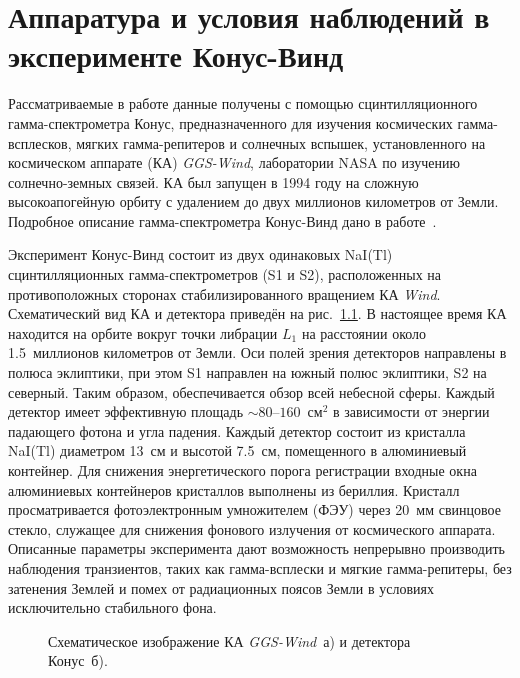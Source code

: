 \chapter{Аппаратура и условия наблюдений в эксперименте Конус-Винд} \label{KW_description}

Рассматриваемые в работе данные получены с помощью сцинтилляционного гамма-спектрометра 
Конус, предназначенного для изучения космических гамма-всплесков, мягких гамма-репитеров и солнечных вспышек,
установленного на космическом аппарате (КА) \textit{GGS-Wind}, лаборатории NASA по изучению 
солнечно-земных связей. КА был запущен в 1994 году на сложную высокоапогейную орбиту 
с удалением до двух миллионов километров от Земли. Подробное описание гамма-спектрометра 
Конус-Винд дано в работе~\citep{Aptekar_1995SSR}.

Эксперимент Конус-Винд состоит из двух одинаковых NaI(Tl) сцинтилляционных 
гамма-спектрометров (S1 и S2), расположенных на противоположных сторонах 
стабилизированного вращением КА \textit{Wind}. 
Схематический вид КА и детектора приведён на рис.~\ref{img:KW_main_view}.
В настоящее время КА находится на орбите вокруг точки либрации $L_1$ 
на расстоянии около 1.5~миллионов километров от Земли. Оси полей зрения детекторов 
направлены в полюса эклиптики, при этом S1 направлен на южный полюс эклиптики, 
S2 на северный. Таким образом, обеспечивается обзор всей небесной сферы. 
Каждый детектор имеет эффективную площадь $\sim 80\textrm{--}160$~см$^2$ в 
зависимости от энергии падающего фотона и угла падения. Каждый детектор состоит 
из кристалла NaI(Tl) диаметром 13~см и высотой 7.5~см, помещенного в алюминиевый 
контейнер. Для снижения энергетического порога регистрации входные окна алюминиевых 
контейнеров кристаллов выполнены из бериллия. Кристалл просматривается фотоэлектронным 
умножителем (ФЭУ) через 20~мм свинцовое стекло, служащее для снижения фонового 
излучения от космического аппарата. Описанные параметры эксперимента дают 
возможность непрерывно производить наблюдения транзиентов, таких как гамма-всплески 
и мягкие гамма-репитеры, без затенения Землей и помех от радиационных поясов Земли 
в условиях исключительно стабильного фона. 

\begin{figure}[h]
  \begin{minipage}[h]{0.5\textwidth}
  \end{minipage}
  \hfill
  \begin{minipage}[h]{0.5\textwidth}
  \end{minipage}
  \caption[Схематическое изображение КА \textit{GGS-Wind} и детектора Конус.]
  {Схематическое изображение КА \textit{GGS-Wind}~а) и детектора Конус~б).}
  \label{img:KW_main_view}  
\end{figure}

